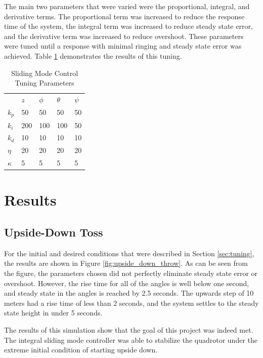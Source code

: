 \documentclass[12pt]{article}
\begin{document}
The main two parameters that were varied were the proportional, integral, and derivative terms. The proportional term was increased to reduce the response time of the system, the integral term was increased to reduce steady state error, and the derivative term was increased to reduce overshoot. These parameters were tuned until a response with minimal ringing and steady state error was achieved. Table \ref{tab:tuning} demonstrates the results of this tuning.

\begin{table}[H]
\centering
\caption{Sliding Mode Control Tuning Parameters}
\label{tab:tuning}
\begin{tabular}{lllll}
         & $z$ & $\phi$ & $\theta$ & $\psi$ \\
$k_p$    & 50  & 50     & 50       & 50     \\
$k_i$    & 200 & 100    & 100      & 50     \\
$k_d$    & 10  & 10     & 10       & 10     \\
$\eta$   & 20  & 20     & 20       & 20     \\
$\kappa$ & 5   & 5      & 5        & 5     
\end{tabular}
\end{table}

\section{Results}
\subsection{Upside-Down Toss}
For the initial and desired conditions that were described in Section \ref{sec:tuning}, the results are shown in Figure \ref{fig:upside_down_throw}. As can be seen from the figure, the parameters chosen did not perfectly eliminate steady state error or overshoot. However, the rise time for all of the angles is well below one second, and steady state in the angles is reached by 2.5 seconds. The upwards step of 10 meters had a rise time of less than 2 seconds, and the system settles to the steady state height in under 5 seconds.

The results of this simulation show that the goal of this project was indeed met. The integral sliding mode controller was able to stabilize the quadrotor under the extreme initial condition of starting upside down. 
\end{document}
